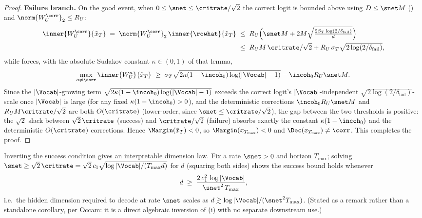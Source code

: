 \begin{proof}
\smallskip\noindent\textbf{Failure branch.} On the good event, when
$0\le\snet\le\critrate/\sqrt2$ the correct logit is bounded above using
$D\le\snet M$ () and $\norm{W_U^{\corr}}_2\le R_U$:
\begin{align*}
   \inner{W_U^{\corr}}{\tilde x_T}
   \;=\; \norm{W_U^{\corr}}_2\,\inner{\rowhat}{\tilde x_T}
   &\;\le\; R_U\Bigl(\snet M + 2M\sqrt{\tfrac{2S_T\log(2/\delta_{\mathrm{fail}})}{d}}\Bigr) \\
   &\;\le\; R_U M\,\critrate/\sqrt2 + R_U\,\sigma_T\sqrt{2\log(2/\delta_{\mathrm{fail}})},
\end{align*}
while  forces, with the absolute Sudakov
constant $\kappa\in(0,1)$ of that lemma,
\begin{align*}
   \max_{a\neq\corr}\inner{W_U^a}{\tilde x_T}
   \;\ge\;
   \sigma_T\sqrt{2\kappa(1-\incoh_0)\log(|\Vocab|-1)}-\incoh_0 R_U\snet M.
\end{align*}
Since the $|\Vocab|$-growing term
$\sqrt{2\kappa(1-\incoh_0)\log(|\Vocab|-1)}$ exceeds the correct logit's
$|\Vocab|$-independent $\sqrt{2\log(2/\delta_{\mathrm{fail}})}$-scale once
$|\Vocab|$ is large (for any fixed $\kappa(1-\incoh_0)>0$), and
the deterministic corrections $\incoh_0 R_U\snet M$ and $R_U M\critrate/\sqrt2$
are both $O(\critrate)$ (lower-order, since $\snet\le\critrate/\sqrt2$),
the gap between the two thresholds is positive: the $\sqrt2$ slack between
$\sqrt2\,\critrate$ (success) and $\critrate/\sqrt2$ (failure) absorbs
exactly the constant $\kappa(1-\incoh_0)$ and the deterministic $O(\critrate)$
corrections. Hence $\Margin(\tilde x_T)<0$, so
$\Margin(x_{T_{\max}})<0$ and $\Dec(x_{T_{\max}})\neq\corr$. This completes
the proof.
\end{proof}

\begin{remark}
\label{rem:min_dimension}
Inverting the success condition gives an interpretable dimension law. Fix a
rate $\snet>0$ and horizon $T_{\max}$; solving
$\snet\ge\sqrt2\,\critrate=\sqrt2\,c_1\sqrt{\log|\Vocab|/(T_{\max}d)}$ for
$d$ (squaring both sides) shows the success bound  holds
whenever
\begin{align}\label{eq:min_dimension}
   d \;\ge\; \frac{2\,c_1^2\,\log|\Vocab|}{\snet^2\,T_{\max}},
\end{align}
i.e.\ the hidden dimension required to decode at rate $\snet$ scales as
$d\gtrsim\log|\Vocab|/(\snet^2 T_{\max})$. (Stated as a remark rather than a
standalone corollary, per Occam: it is a direct algebraic inversion of
(i) with no separate downstream use.)
\end{remark}

